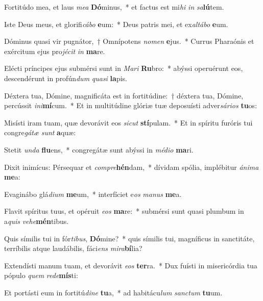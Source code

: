 \item Fortitúdo mea, et laus \textit{me}\textit{a} \textbf{Dó}minus,~* et factus est mi\textit{hi} \textit{in} \textit{sa}\textbf{lú}tem.
\item Iste Deus meus, et glorifi\textit{cá}\textit{bo} \textbf{e}um:~* Deus patris mei, et ex\textit{al}\textit{tá}\textit{bo} \textbf{e}um.
\item Dóminus quasi vir pugnátor,~† Omnípotens \textit{no}\textit{men} \textbf{e}jus.~* Currus Pharaónis et exércitum ejus pro\textit{jé}\textit{cit} \textit{in} \textbf{ma}re.
\item Elécti príncipes ejus submérsi sunt in \textit{Ma}\textit{ri} \textbf{Ru}bro:~* abýssi operuérunt eos, descendérunt in profún\textit{dum} \textit{qua}\textit{si} \textbf{la}pis.
\item Déxtera tua, Dómine, magnificáta est in fortitúdine:~† déxtera tua, Dómine, percússit \textit{in}\textit{i}\textbf{mí}cum.~* Et in multitúdine glóriæ tuæ deposuísti adver\textit{sá}\textit{ri}\textit{os} \textbf{tu}os:
\item Misísti iram tuam, quæ devorávit eos \textit{sic}\textit{ut} \textbf{stí}pulam.~* Et in spíritu furóris tui congre\textit{gá}\textit{tæ} \textit{sunt} \textbf{a}quæ:
\item Stetit \textit{un}\textit{da} \textbf{flu}ens,~* congregátæ sunt abýssi in \textit{mé}\textit{di}\textit{o} \textbf{ma}ri.
\item Dixit inimícus: Pérsequar et \textit{com}\textit{pre}\textbf{hén}dam,~* dívidam spólia, implébitur \textit{á}\textit{ni}\textit{ma} \textbf{me}a:
\item Evaginábo glá\textit{di}\textit{um} \textbf{me}um,~* interfíciet e\textit{os} \textit{ma}\textit{nus} \textbf{me}a.
\item Flavit spíritus tuus, et opéruit \textit{e}\textit{os} \textbf{ma}re:~* submérsi sunt quasi plumbum in a\textit{quis} \textit{ve}\textit{he}\textbf{mén}tibus.
\item Quis símilis tui in fór\textit{ti}\textit{bus}, \textbf{Dó}mine?~* quis símilis tui, magníficus in sanctitáte, terríbilis atque laudábilis, fáci\textit{ens} \textit{mi}\textit{ra}\textbf{bí}lia?
\item Extendísti manum tuam, et devorávit \textit{e}\textit{os} \textbf{ter}ra.~* Dux fuísti in misericórdia tua pópulo \textit{quem} \textit{red}\textit{e}\textbf{mís}ti:
\item Et portásti eum in fortitú\textit{di}\textit{ne} \textbf{tu}a,~* ad habitácu\textit{lum} \textit{sanc}\textit{tum} \textbf{tu}um.
